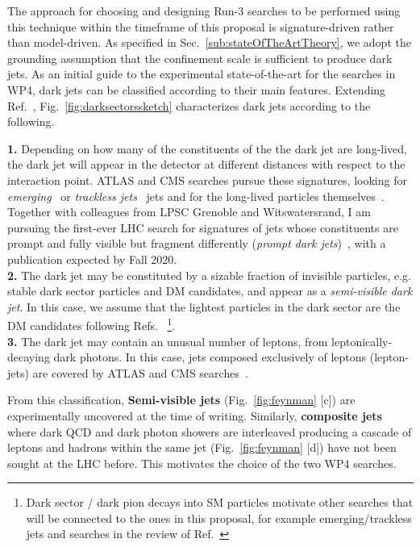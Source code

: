 The approach for choosing and designing Run-3 searches to be performed using this technique within the timeframe of this proposal is signature-driven rather than model-driven. 
As specified in Sec.~\ref{sub:stateOfTheArtTheory}, we adopt the grounding assumption that the confinement scale is sufficient to produce dark jets. 
As an initial guide to the experimental state-of-the-art for the searches in WP4, dark jets can be classified according to their main features. 
Extending Ref.~\cite{Cohen:2017pzm, Park:2017rfb}, Fig.~\ref{fig:darksectorssketch} characterizes dark jets according to the following.  

\noindent
\textbf{1.} Depending on how many of the constituents of the the dark jet are long-lived, the dark jet will appear in the detector at different distances with respect to the interaction point. ATLAS and CMS searches pursue these signatures, looking for \textit{emerging}~\cite{Sirunyan:2018njd} or \textit{trackless jets}~\cite{ToBeCited} jets and for the long-lived particles themselves~\cite{ToBeCited}. Together with colleagues from LPSC Grenoble and Witswatersrand, I am pursuing the first-ever LHC search for signatures of jets whose constituents are prompt and fully visible but fragment differently (\textit{prompt dark jets})~\cite{Park:2017rfb}, with a publication expected by Fall 2020. \\
\textbf{2.} The dark jet may be constituted by a sizable fraction of invisible particles, e.g. stable dark sector particles and DM candidates, and appear as a \textit{semi-visible dark jet}. In this case, we assume that the lightest particles in the dark sector are the DM candidates following Refs.~\cite{Cohen:2017pzm,Park:2017rfb,ToBeCited}%
\footnote{Dark sector / dark pion decays into SM particles motivate other searches that will be connected to the ones in this proposal, for example emerging/trackless jets and searches in the review of Ref.~\cite{ToBeCited}}.%
\\
\textbf{3.}  The dark jet may contain an unusual number of leptons, from leptonically-decaying dark photons. In this case, jets composed exclusively of leptons (lepton-jets) are covered by ATLAS and CMS searches~\cite{ToBeCited}.%

From this classification, \textbf{Semi-visible jets}  (Fig.~\ref{fig:feynman} [c]) are experimentally uncovered at the time of writing. 
Similarly,  \textbf{composite jets} where dark QCD and dark photon showers are interleaved producing a cascade of leptons and hadrons within the same jet (Fig.~\ref{fig:feynman} [d]) have not been sought at the LHC before. 
This motivates the choice of the two WP4 searches. 

